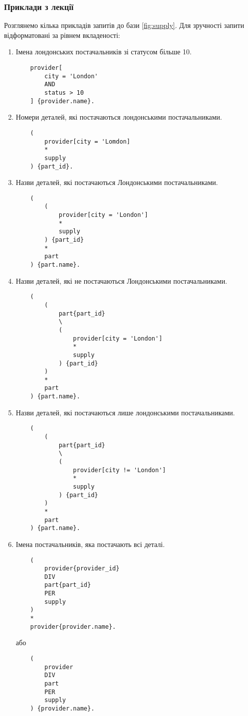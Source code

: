 \subsubsection{Приклади з лекції}
Розглянемо кілька прикладів запитів до бази \ref{fig:supply}. Для зручності запити відформатовані за рівнем вкладеності:
\begin{enumerate}
    \item Імена лондонських постачальників зі статусом більше 10.
    \begin{verbatim}
    provider[
        city = 'London' 
        AND 
        status > 10
    ] {provider.name}.
    \end{verbatim}
    
    \item Номери деталей, які постачаються лондонськими постачальниками.
    \begin{verbatim}
    (
        provider[city = 'Lomdon]
        *
        supply
    ) {part_id}.
    \end{verbatim}
    
    \item Назви деталей, які постачаються Лондонськими постачальниками.
    \begin{verbatim}
    (
        (
            provider[city = 'London']
            *
            supply
        ) {part_id}
        *
        part
    ) {part.name}.
    \end{verbatim}
    
    \item Назви деталей, які не постачаються Лондонськими постачальниками.
    \begin{verbatim}
    (
        (
            part{part_id} 
            \ 
            (
                provider[city = 'London']
                * 
                supply
            ) {part_id}
        )
        * 
        part
    ) {part.name}.
    \end{verbatim}
    
    \item Назви деталей, які постачаються лише лондонськими постачальниками.
    \begin{verbatim}
    (
        (
            part{part_id}
            \ 
            (
                provider[city != 'London']
                *
                supply
            ) {part_id}
        )
        *
        part
    ) {part.name}.
    \end{verbatim}
    
    \item Імена постачальників, яка постачають всі деталі.
    \begin{verbatim}
    (
        provider{provider_id}
        DIV
        part{part_id}
        PER
        supply
    )
    *
    provider{provider.name}.
    \end{verbatim}
    або
    \begin{verbatim}
    (
        provider
        DIV
        part
        PER
        supply
    ) {provider.name}.
    \end{verbatim}
    

\end{enumerate}
